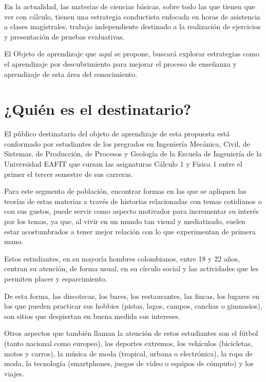 \documentclass[twoside,letterpaper,12pt]{report}
\begin{document}
En la actualidad, las materias de ciencias básicas, sobre todo las que tienen que ver con cálculo, tienen una estrategia conductista enfocada en horas de asistencia a clases magistrales, trabajo independiente destinado a la realización de ejercicios y presentación de pruebas evaluativas.

El Objeto de aprendizaje que aquí se propone, buscará explorar estrategias como el aprendizaje por descubrimiento para mejorar el proceso de enseñanza y aprendizaje de esta área del conocimiento.


\section{¿Quién es el destinatario?} %
\label{sec:_qui_n_es_el_destinatario_}

El público destinatario del objeto de aprendizaje de esta propuesta está conformado por estudiantes de los pregrados en Ingeniería Mecánica, Civil, de Sistemas, de Producción, de Procesos y Geología de la Escuela de Ingeniería de la Universidad EAFIT que cursan las asignaturas Cálculo 1 y Física 1 entre el primer el tercer semestre de sus carreras.

Para este segmento de población, encontrar formas en las que se apliquen las teorías de estas materias a través de historias relacionadas con temas cotidianos o con sus gustos, puede servir como aspecto motivador para incrementar su interés por los temas, ya que, al vivir en un mundo tan visual y mediatizado, suelen estar acostumbrados a tener mejor relación con lo que experimentan de primera mano.

Estos estudiantes, en su mayoría hombres colombianos, entre 18 y 22 años, centran su atención, de forma usual, en su círculo social y las actividades que les permiten placer y esparcimiento.

De esta forma, las discotecas, los bares, los restaurantes, las fincas, los lugares en los que pueden practicar sus hobbies (pistas, lagos, campos, canchas o gimnasios), son sitios que despiertan en buena medida sus intereses.

Otros aspectos que también llaman la atención de estos estudiantes son el fútbol (tanto nacional como europeo), los deportes extremos, los vehículos (bicicletas, motos y carros), la música de moda (tropical, urbana o electrónica), la ropa de moda, la tecnología (smartphones, juegos de video o equipos de cómputo) y los viajes. 
\end{document}

